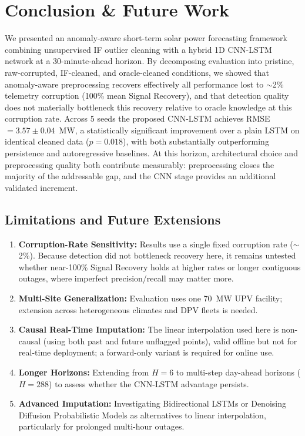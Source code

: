 \documentclass[conference]{IEEEtran}
\begin{document}
\section{Conclusion \& Future Work}

We presented an anomaly-aware short-term solar power forecasting framework combining unsupervised IF outlier cleaning with a hybrid 1D CNN-LSTM network at a 30-minute-ahead horizon. By decomposing evaluation into pristine, raw-corrupted, IF-cleaned, and oracle-cleaned conditions, we showed that anomaly-aware preprocessing recovers effectively all performance lost to $\sim$2\% telemetry corruption (100\% mean Signal Recovery), and that detection quality does not materially bottleneck this recovery relative to oracle knowledge at this corruption rate. Across 5 seeds the proposed CNN-LSTM achieves RMSE $=3.57\pm0.04$~MW, a statistically significant improvement over a plain LSTM on identical cleaned data ($p=0.018$), with both substantially outperforming persistence and autoregressive baselines. At this horizon, architectural choice and preprocessing quality both contribute measurably: preprocessing closes the majority of the addressable gap, and the CNN stage provides an additional validated increment.

\subsection*{Limitations and Future Extensions}
\begin{enumerate}
    \item \textbf{Corruption-Rate Sensitivity:} Results use a single fixed corruption rate ($\sim$2\%). Because detection did not bottleneck recovery here, it remains untested whether near-100\% Signal Recovery holds at higher rates or longer contiguous outages, where imperfect precision/recall may matter more.
    \item \textbf{Multi-Site Generalization:} Evaluation uses one 70~MW UPV facility; extension across heterogeneous climates and DPV fleets is needed.
    \item \textbf{Causal Real-Time Imputation:} The linear interpolation used here is non-causal (using both past and future unflagged points), valid offline but not for real-time deployment; a forward-only variant is required for online use.
    \item \textbf{Longer Horizons:} Extending from $H=6$ to multi-step day-ahead horizons ($H=288$) to assess whether the CNN-LSTM advantage persists.
    \item \textbf{Advanced Imputation:} Investigating Bidirectional LSTMs or Denoising Diffusion Probabilistic Models as alternatives to linear interpolation, particularly for prolonged multi-hour outages.
\end{enumerate}
\end{document}
